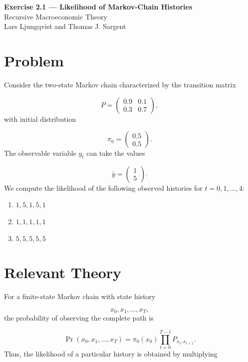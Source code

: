 \documentclass[11pt]{article}
\begin{document}
\begin{center}
    {\LARGE \textbf{Exercise 2.1 — Likelihood of Markov-Chain Histories}}\\[0.5em]
    {\large Recursive Macroeconomic Theory}\\[0.25em]
    {\normalsize Lars Ljungqvist and Thomas J. Sargent}
\end{center}

\vspace{1em}

\section*{Problem}

Consider the two-state Markov chain characterized by the transition matrix

\[
P =
\begin{pmatrix}
0.9 & 0.1 \\
0.3 & 0.7
\end{pmatrix},
\]
with initial distribution

\[
\pi_0 =
\begin{pmatrix}
0.5 \\
0.5
\end{pmatrix}.
\]
The observable variable \(y_t\) can take the values

\[
\bar y =
\begin{pmatrix}
1 \\
5
\end{pmatrix}.
\]
We compute the likelihood of the following observed histories for
\(t=0,1,\ldots,4\):

\begin{enumerate}[label=\alph*.]
    \item \(1,5,1,5,1\)
    \item \(1,1,1,1,1\)
    \item \(5,5,5,5,5\)
\end{enumerate}

\section*{Relevant Theory}

For a finite-state Markov chain with state history

\[
x_0,x_1,\ldots,x_T,
\]
the probability of observing the complete path is

\[
\Pr(x_0,x_1,\ldots,x_T)
=
\pi_0(x_0)
\prod_{t=0}^{T-1}
P_{x_t,x_{t+1}}.
\]
Thus, the likelihood of a particular history is obtained by multiplying
\end{document}
